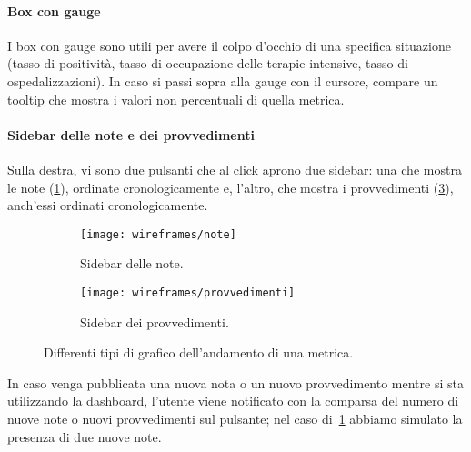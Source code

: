 \paragraph{Box con gauge}
I box con gauge sono utili per avere il colpo d'occhio di una specifica situazione (tasso di positività, tasso di occupazione delle terapie intensive, tasso di ospedalizzazioni). In caso si passi sopra alla gauge con il cursore, compare un tooltip che mostra i valori non percentuali di quella metrica.

\paragraph{Sidebar delle note e dei provvedimenti}
Sulla destra, vi sono due pulsanti che al click aprono due sidebar: una che mostra le note (\ref{fig:note}), ordinate cronologicamente e, l'altro, che mostra i provvedimenti (\ref{fig:provvedimenti}), anch'essi ordinati cronologicamente. 
\begin{figure}[H]
    \begin{subfigure}[b]{0.5\textwidth}
        \centering
        \texttt{[image: wireframes/note]}
        \caption{Sidebar delle note.}
        \label{fig:note}
    \end{subfigure}
\hfill
    \begin{subfigure}[b]{0.5\textwidth}
        \centering
        \texttt{[image: wireframes/provvedimenti]}
        \caption{Sidebar dei provvedimenti.}
        \label{fig:provvedimenti}
    \end{subfigure}
    \caption{Differenti tipi di grafico dell'andamento di una metrica.}
\end{figure}
In caso venga pubblicata una nuova nota o un nuovo provvedimento mentre si sta utilizzando la dashboard, l'utente viene notificato con la comparsa del numero di nuove note o nuovi provvedimenti sul pulsante; nel caso di~\ref{fig:note} abbiamo simulato la presenza di due nuove note.


